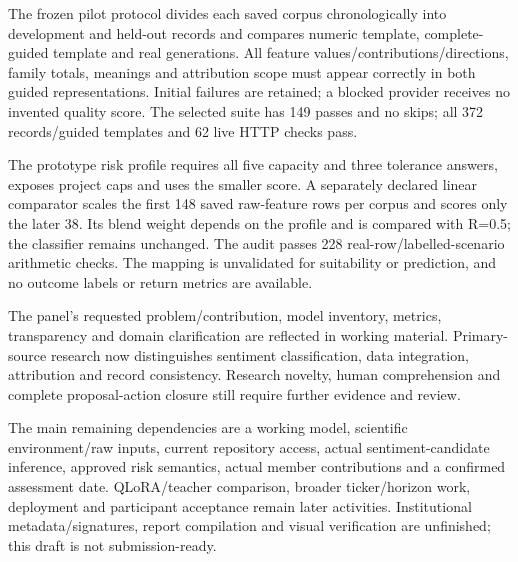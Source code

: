 The frozen pilot protocol divides each saved corpus chronologically into development and held-out records and compares numeric template, complete-guided template and real generations. All feature values/contributions/directions, family totals, meanings and attribution scope must appear correctly in both guided representations. Initial failures are retained; a blocked provider receives no invented quality score. The selected suite has 149 passes and no skips; all 372 records/guided templates and 62 live HTTP checks pass.

The prototype risk profile requires all five capacity and three tolerance answers, exposes project caps and uses the smaller score. A separately declared linear comparator scales the first 148 saved raw-feature rows per corpus and scores only the later 38. Its blend weight depends on the profile and is compared with R=0.5; the classifier remains unchanged. The audit passes 228 real-row/labelled-scenario arithmetic checks. The mapping is unvalidated for suitability or prediction, and no outcome labels or return metrics are available.

The panel's requested problem/contribution, model inventory, metrics, transparency and domain clarification are reflected in working material. Primary-source research now distinguishes sentiment classification, data integration, attribution and record consistency. Research novelty, human comprehension and complete proposal-action closure still require further evidence and review.

The main remaining dependencies are a working model, scientific environment/raw inputs, current repository access, actual sentiment-candidate inference, approved risk semantics, actual member contributions and a confirmed assessment date. QLoRA/teacher comparison, broader ticker/horizon work, deployment and participant acceptance remain later activities. Institutional metadata/signatures, report compilation and visual verification are unfinished; this draft is not submission-ready.
